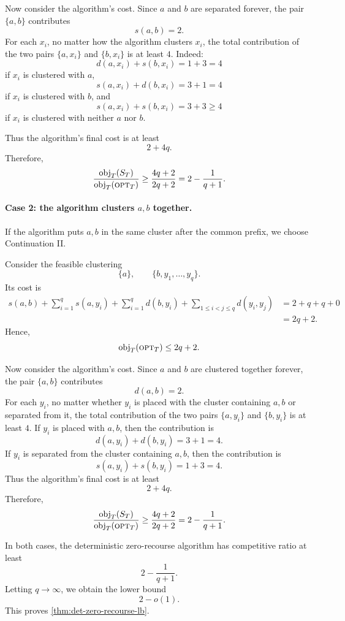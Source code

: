 Now consider the algorithm's cost. Since \(a\) and \(b\) are separated forever, the pair \(\{a,b\}\) contributes
\[
    s(a,b)=2.
\]
For each \(x_i\), no matter how the algorithm clusters \(x_i\), the total contribution of the two pairs \(\{a,x_i\}\) and \(\{b,x_i\}\) is at least \(4\). Indeed:
\[
    d(a,x_i)+s(b,x_i)=1+3=4
\]
if \(x_i\) is clustered with \(a\),
\[
    s(a,x_i)+d(b,x_i)=3+1=4
\]
if \(x_i\) is clustered with \(b\), and
\[
    s(a,x_i)+s(b,x_i)=3+3\ge 4
\]
if \(x_i\) is clustered with neither \(a\) nor \(b\).

Thus the algorithm's final cost is at least
\[
    2+4q.
\]
Therefore,
\[
    \frac{\text{obj}_T(S_T)}{\text{obj}_T(\textsc{opt}_T)}
    \ge
    \frac{4q+2}{2q+2}
    =
    2-\frac{1}{q+1}.
\]

\paragraph{Case 2: the algorithm clusters \(a,b\) together.}
If the algorithm puts \(a,b\) in the same cluster after the common prefix, we choose Continuation II.

Consider the feasible clustering
\[
    \{a\},
    \qquad
    \{b,y_1,\ldots,y_q\}.
\]
Its cost is
\[
\begin{aligned}
    s(a,b)
    +
    \sum_{i=1}^q s(a,y_i)
    +
    \sum_{i=1}^q d(b,y_i)
    +
    \sum_{1\le i<j\le q} d(y_i,y_j)
    &=
    2+q+q+0\\
    &=
    2q+2.
\end{aligned}
\]
Hence,
\[
    \text{obj}_T(\textsc{opt}_T)\le 2q+2.
\]

Now consider the algorithm's cost. Since \(a\) and \(b\) are clustered together forever, the pair \(\{a,b\}\) contributes
\[
    d(a,b)=2.
\]
For each \(y_i\), no matter whether \(y_i\) is placed with the cluster containing \(a,b\) or separated from it, the total contribution of the two pairs \(\{a,y_i\}\) and \(\{b,y_i\}\) is at least \(4\). If \(y_i\) is placed with \(a,b\), then the contribution is
\[
    d(a,y_i)+d(b,y_i)=3+1=4.
\]
If \(y_i\) is separated from the cluster containing \(a,b\), then the contribution is
\[
    s(a,y_i)+s(b,y_i)=1+3=4.
\]
Thus the algorithm's final cost is at least
\[
    2+4q.
\]
Therefore,
\[
    \frac{\text{obj}_T(S_T)}{\text{obj}_T(\textsc{opt}_T)}
    \ge
    \frac{4q+2}{2q+2}
    =
    2-\frac{1}{q+1}.
\]

In both cases, the deterministic zero-recourse algorithm has competitive ratio at least
\[
    2-\frac{1}{q+1}.
\]
Letting \(q\to\infty\), we obtain the lower bound
\[
    2-o(1).
\]
This proves \cref{thm:det-zero-recourse-lb}.

